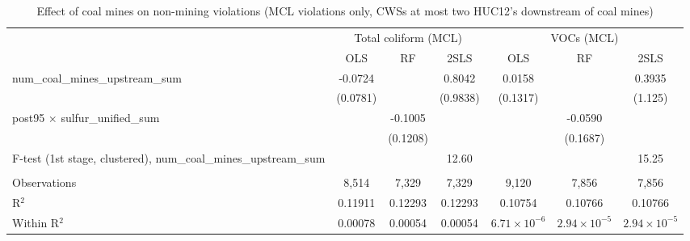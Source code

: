 
\begin{table}[htbp]
   
   \caption{\label{2sls_dwnstrm2step_nonminevio_mcl_ivsum} Effect of coal mines on non-mining violations (MCL violations only, CWSs at most two HUC12's downstream of coal mines)}
   \bigskip
   
   \centering
   
   \begin{adjustbox}{width = \textwidth, center}
      
      
      \begin{tabular}{lcccccc}
         \toprule
         
          & \multicolumn{3}{c}{Total coliform (MCL)} & \multicolumn{3}{c}{VOCs (MCL)}\\
         
                                                                            & OLS           & RF            & 2SLS          & OLS                   & RF                    & 2SLS\\  
         
         \midrule 
         num\_coal\_mines\_upstream\_sum                                    & -0.0724       &               & 0.8042        & 0.0158                &                       & 0.3935\\   
                                                                            & (0.0781)      &               & (0.9838)      & (0.1317)              &                       & (1.125)\\   
         post95 $\times$ sulfur\_unified\_sum                               &               & -0.1005       &               &                       & -0.0590               &   \\   
                                                                            &               & (0.1208)      &               &                       & (0.1687)              &   \\   
         
         F-test (1st stage, clustered), num\_coal\_mines\_upstream\_sum     &               &               & 12.60         &                       &                       & 15.25\\  
         
          \\
         
         Observations                                                       & 8,514         & 7,329         & 7,329         & 9,120                 & 7,856                 & 7,856\\  
         R$^2$                                                              & 0.11911       & 0.12293       & 0.12293       & 0.10754               & 0.10766               & 0.10766\\  
         Within R$^2$                                                       & 0.00078       & 0.00054       & 0.00054       & $6.71\times 10^{-6}$  & $2.94\times 10^{-5}$  & $2.94\times 10^{-5}$\\   
         

\end{tabular}
\end{adjustbox}
\end{table}
